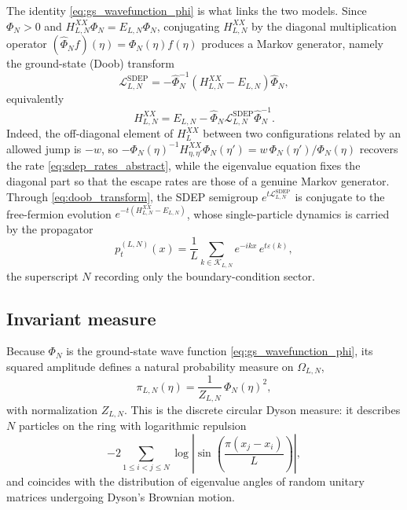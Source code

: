 \documentclass[11pt]{article}
\numberwithin{equation}{section}
\newcommand{\1}{\mathbf 1}
\begin{document}
The identity \eqref{eq:gs_wavefunction_phi} is what links the two models.  Since
\(\Phi_N>0\) and \(H_{L,N}^{XX}\Phi_N=E_{L,N}\Phi_N\), conjugating
\(H_{L,N}^{XX}\) by the diagonal multiplication operator
\((\widehat\Phi_N f)(\eta)=\Phi_N(\eta)f(\eta)\) produces a Markov generator,
namely the ground-state (Doob) transform
\begin{equation}
    \mathcal L_{L,N}^{\mathrm{SDEP}}
    =
    -\widehat\Phi_N^{-1}
    \left(
    H_{L,N}^{XX}-E_{L,N}
    \right)
    \widehat\Phi_N ,
    \label{eq:doob_transform}
\end{equation}
equivalently
\begin{equation}
    H_{L,N}^{XX}
    =
    E_{L,N}
    -
    \widehat\Phi_N
    \mathcal L_{L,N}^{\mathrm{SDEP}}
    \widehat\Phi_N^{-1}.
    \label{eq:inverse_doob_transform}
\end{equation}
Indeed, the off-diagonal element of \(H_{L}^{XX}\) between two configurations
related by an allowed jump is \(-w\), so
\(-\Phi_N(\eta)^{-1}H^{XX}_{\eta,\eta'}\Phi_N(\eta')=w\,\Phi_N(\eta')/\Phi_N(\eta)\)
recovers the rate \eqref{eq:sdep_rates_abstract}, while the eigenvalue equation
fixes the diagonal part so that the escape rates are those of a genuine Markov
generator.  Through \eqref{eq:doob_transform}, the SDEP semigroup
\(e^{t\mathcal L_{L,N}^{\mathrm{SDEP}}}\) is conjugate to the free-fermion
evolution \(e^{-t(H_{L,N}^{XX}-E_{L,N})}\), whose single-particle dynamics is
carried by the propagator
\begin{equation}
    p_t^{(L,N)}(x)
    =
    \frac{1}{L}
    \sum_{k\in\mathcal K_{L,N}}
    e^{-ikx}\,e^{t\varepsilon(k)},
    \label{eq:finite_volume_kernel}
\end{equation}
the superscript \(N\) recording only the boundary-condition sector.

\subsection{Invariant measure}
\label{subsec:invariant_measure}

Because \(\Phi_N\) is the ground-state wave function
\eqref{eq:gs_wavefunction_phi}, its squared amplitude defines a natural
probability measure on \(\Omega_{L,N}\),
\begin{equation}
    \pi_{L,N}(\eta)
    =
    \frac{1}{Z_{L,N}}\,\Phi_N(\eta)^2,
    \label{eq:dyson_measure}
\end{equation}
with normalization \(Z_{L,N}\).  This is the discrete circular Dyson measure: it
describes \(N\) particles on the ring with logarithmic repulsion
\[
    -2\sum_{1\leq i<j\leq N}
    \log\left|
    \sin\left(\frac{\pi(x_j-x_i)}{L}\right)
    \right| ,
\]
and coincides with the distribution of eigenvalue angles of random unitary
matrices undergoing Dyson's Brownian motion.
\end{document}
